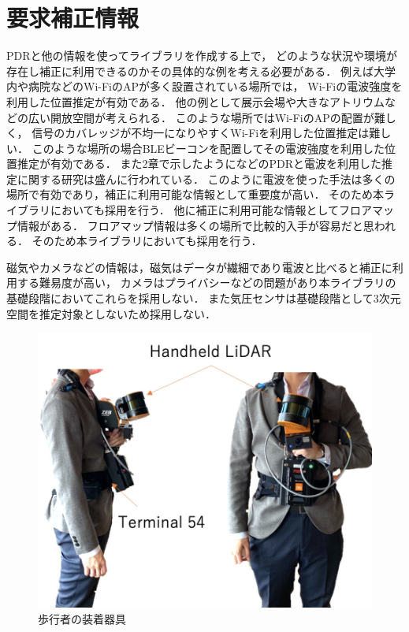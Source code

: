 
\section{要求補正情報}

PDRと他の情報を使ってライブラリを作成する上で，
どのような状況や環境が存在し補正に利用できるのかその具体的な例を考える必要がある．
例えば大学内や病院などのWi-FiのAPが多く設置されている場所では，
Wi-Fiの電波強度を利用した位置推定が有効である．
他の例として展示会場や大きなアトリウムなどの広い開放空間が考えられる．
このような場所ではWi-FiのAPの配置が難しく，
信号のカバレッジが不均一になりやすくWi-Fiを利用した位置推定は難しい．
このような場所の場合BLEビーコンを配置してその電波強度を利用した位置推定が有効である．
また2章で示したように\cite{pdr-wifi}\cite{pdr-ble}などのPDRと電波を利用した推定に関する研究は盛んに行われている．
このように電波を使った手法は多くの場所で有効であり，補正に利用可能な情報として重要度が高い．
そのため本ライブラリにおいても採用を行う．
他に補正に利用可能な情報としてフロアマップ情報がある．
フロアマップ情報は多くの場所で比較的入手が容易だと思われる．
そのため本ライブラリにおいても採用を行う．

磁気やカメラなどの情報は，磁気はデータが繊細であり電波と比べると補正に利用する難易度が高い，
カメラはプライバシーなどの問題があり本ライブラリの基礎段階においてこれらを採用しない．
また気圧センサは基礎段階として3次元空間を推定対象としないため採用しない．


\begin{figure}[ht]
	\centering
	\includegraphics[width=\linewidth]{image/lidar.jpg}
	\caption{歩行者の装着器具}    \label{fig:step_detect}
\end{figure}




